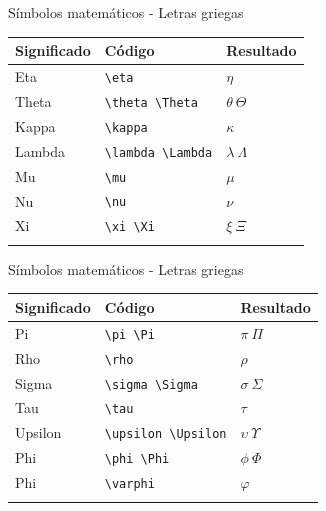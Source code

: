 \documentclass[
  ignorenonframetext,
]{beamer}
\begin{document}
\begin{frame}[fragile]{Símbolos matemáticos - Letras griegas}
\label{suxedmbolos-matemuxe1ticos---letras-griegas-1}
\begin{longtable}[]{@{}lll@{}}
\toprule\noalign{}
Significado & Código & Resultado \\
\midrule\noalign{}
\endhead
Eta & \texttt{\textbackslash{}eta} & \(\eta\) \\
Theta & \texttt{\textbackslash{}theta\ \textbackslash{}Theta} &
\(\theta\ \Theta\) \\
Kappa & \texttt{\textbackslash{}kappa} & \(\kappa\) \\
Lambda & \texttt{\textbackslash{}lambda\ \textbackslash{}Lambda} &
\(\lambda\  \Lambda\) \\
Mu & \texttt{\textbackslash{}mu} & \(\mu\) \\
Nu & \texttt{\textbackslash{}nu} & \(\nu\) \\
Xi & \texttt{\textbackslash{}xi\ \textbackslash{}Xi} & \(\xi\ \Xi\) \\
\bottomrule\noalign{}
\end{longtable}
\end{frame}

\begin{frame}[fragile]{Símbolos matemáticos - Letras griegas}
\label{suxedmbolos-matemuxe1ticos---letras-griegas-2}
\begin{longtable}[]{@{}lll@{}}
\toprule\noalign{}
Significado & Código & Resultado \\
\midrule\noalign{}
\endhead
Pi & \texttt{\textbackslash{}pi\ \textbackslash{}Pi} & \(\pi\ \Pi\) \\
Rho & \texttt{\textbackslash{}rho} & \(\rho\) \\
Sigma & \texttt{\textbackslash{}sigma\ \textbackslash{}Sigma} &
\(\sigma\ \Sigma\) \\
Tau & \texttt{\textbackslash{}tau} & \(\tau\) \\
Upsilon & \texttt{\textbackslash{}upsilon\ \textbackslash{}Upsilon} &
\(\upsilon\ \Upsilon\) \\
Phi & \texttt{\textbackslash{}phi\ \textbackslash{}Phi} &
\(\phi\ \Phi\) \\
Phi & \texttt{\textbackslash{}varphi} & \(\varphi\) \\
\bottomrule\noalign{}
\end{longtable}
\end{frame}
\end{document}
